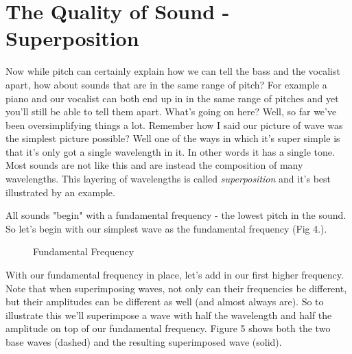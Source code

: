 \documentclass[10pt,a5paper]{book}
\begin{document}
\section{The Quality of Sound - Superposition}
Now while pitch can certainly explain how we can tell the bass and the vocalist apart, how about sounds that are in the same range of pitch? For example a piano and our vocalist can both end up in in the same range of pitches and yet you'll still be able to tell them apart. What's going on here? Well, so far we've been oversimplifying things a lot. Remember how I said our picture of wave was the simplest picture possible? Well one of the ways in which it's super simple is that it's only got a single wavelength in it. In other words it has a single tone. Most sounds are not like this and are instead the composition of many wavelengths. This layering of wavelengths is called \textit{superposition} and it's best illustrated by an example. 

All sounds "begin" with a fundamental frequency - the lowest pitch in the sound. So let's begin with our simplest wave as the fundamental frequency (Fig 4.).

\begin{figure}[!htb]
\caption{\label{fig:my-label} Fundamental Frequency}
\end{figure}

With our fundamental frequency in place, let's add in our first higher frequency. Note that when superimposing waves, not only can their frequencies be different, but their amplitudes can be different as well (and almost always are). So to illustrate this we'll superimpose a wave with half the wavelength and half the amplitude on top of our fundamental frequency. Figure 5 shows both the two base waves (dashed) and the resulting superimposed wave (solid).
\end{document}
